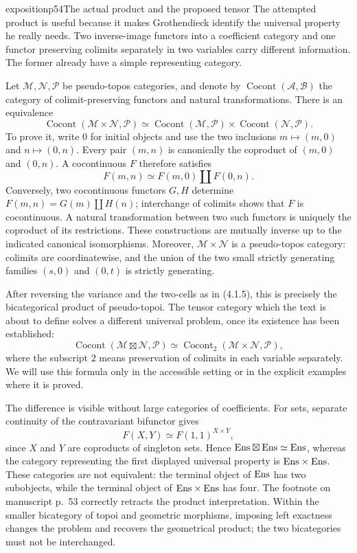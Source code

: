 \begin{dcomment}{exposition}{p54}{The actual product and the proposed tensor}
The attempted product is useful because it makes Grothendieck identify the universal property he really needs. Two inverse-image functors into a coefficient category and one functor preserving colimits separately in two variables carry different information. The former already have a simple representing category.

Let $\mathcal M,\mathcal N,\mathcal P$ be pseudo-topos categories, and denote by $\operatorname{Cocont}(\mathcal A,\mathcal B)$ the category of colimit-preserving functors and natural transformations. There is an equivalence
\[
 \operatorname{Cocont}(\mathcal M\times\mathcal N,\mathcal P)
 \simeq
 \operatorname{Cocont}(\mathcal M,\mathcal P)
 \times\operatorname{Cocont}(\mathcal N,\mathcal P).
\]
To prove it, write $0$ for initial objects and use the two inclusions $m\mapsto(m,0)$ and $n\mapsto(0,n)$. Every pair $(m,n)$ is canonically the coproduct of $(m,0)$ and $(0,n)$. A cocontinuous $F$ therefore satisfies
\[
 F(m,n)\simeq F(m,0)\amalg F(0,n).
\]
Conversely, two cocontinuous functors $G,H$ determine $F(m,n)=G(m)\amalg H(n)$; interchange of colimits shows that $F$ is cocontinuous. A natural transformation between two such functors is uniquely the coproduct of its restrictions. These constructions are mutually inverse up to the indicated canonical isomorphisms. Moreover, $\mathcal M\times\mathcal N$ is a pseudo-topos category: colimits are coordinatewise, and the union of the two small strictly generating families $(s,0)$ and $(0,t)$ is strictly generating.

After reversing the variance and the two-cells as in (4.1.5), this is precisely the bicategorical product of pseudo-topoi. The tensor category which the text is about to define solves a different universal problem, once its existence has been established:
\[
 \operatorname{Cocont}(\mathcal M\boxtimes\mathcal N,\mathcal P)
 \simeq \operatorname{Cocont}_{2}(\mathcal M\times\mathcal N,\mathcal P),
\]
where the subscript $2$ means preservation of colimits in each variable separately. We will use this formula only in the accessible setting or in the explicit examples where it is proved.

The difference is visible without large categories of coefficients. For sets, separate continuity of the contravariant bifunctor gives
\[
 F(X,Y)\simeq F(1,1)^{X\times Y},
\]
since $X$ and $Y$ are coproducts of singleton sets. Hence $\mathrm{Ens}\boxtimes\mathrm{Ens}\simeq\mathrm{Ens}$, whereas the category representing the first displayed universal property is $\mathrm{Ens}\times\mathrm{Ens}$. These categories are not equivalent: the terminal object of $\mathrm{Ens}$ has two subobjects, while the terminal object of $\mathrm{Ens}\times\mathrm{Ens}$ has four. The footnote on manuscript p.~53 correctly retracts the product interpretation. Within the smaller bicategory of topoi and geometric morphisms, imposing left exactness changes the problem and recovers the geometrical product; the two bicategories must not be interchanged.
\end{dcomment}


